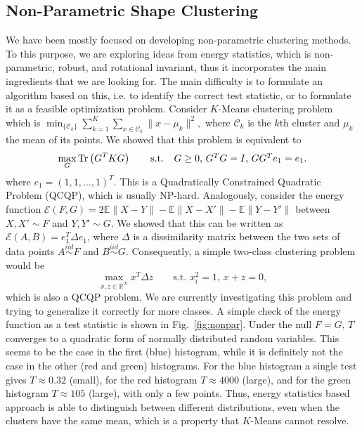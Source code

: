\documentclass[simplex.tex]{subfiles}
\begin{document}
\subsection{Non-Parametric Shape Clustering}
%
We have been mostly focused on developing 
non-parametric clustering methods.
To this purpose, we are exploring ideas from energy statistics,
which is non-parametric,
robust, and rotational invariant, thus it incorporates the main ingredients
that we are looking for. The main difficulty is to formulate an 
algorithm based on this, i.e. to identify the correct test 
statistic, or to formulate it as a feasible optimization problem.
Consider $K$-Means clustering problem which is 
$
\min_{\{\mathcal{C}_k\}} 
\sum_{k=1}^K \sum_{x \in \mathcal{C}_k} \| x - \mu_k  \|^2,
$
where $\mathcal{C}_k$ is the $k$th cluster and $\mu_k$ the mean of its points.
We showed that this problem is equivalent to
\begin{equation}
\max_{G} \textnormal{Tr}\left( G^T K G \right) \qquad 
\mbox{s.t. \, $G \ge 0$, $G^T G=I$, $G G^T e_1 = e_1$}.
\end{equation}
where $e_1 = (1,1,\dotsc,1)^T$.
This is a Quadratically Constrained Quadratic Problem (QCQP), which is usually 
NP-hard.
Analogously, consider the energy function 
$\mathcal{E}(F,G) = 2\mathbb{E} \| X - Y\| - \mathbb{E}\| X - X'\| - \mathbb{E}
\| Y - Y'\|$ between $X,X' \sim F$ and $Y,Y' \sim G$. We showed that this can
be written as $\mathcal{E}(A,B) = e_1^T \Delta e_1 $, where $\Delta$ is a
dissimilarity 
matrix between the two sets of data points 
$A \stackrel{iid}{\sim} F$ 
and $B \stackrel{iid}{\sim} G$.
Consequently, a simple two-class clustering problem would be
\begin{equation}
\max_{x,z\in \mathbb{R}^N} x^T \Delta z \qquad 
\mbox{s.t. $x_i^2=1$, $x+z = 0$},
\end{equation}
which is also a QCQP problem. We are currently investigating this problem and
trying to generalize it correctly for more classes.
A simple check of the energy function as a test statistic 
is shown in Fig.~\ref{fig:nonpar}. 
Under the null $F = G$, 
$T$ converges to a quadratic form of normally distributed random variables. This
seems to be the case in the first (blue) histogram, while it is definitely not
the case in the other (red and green) histograms. 
For the blue histogram a single test gives
$T \approx 0.32$ (small), for the red
histogram $T \approx 4000 $ (large), and for the green 
histogram $T \approx 105$ (large), with
only a few points. Thus, energy statistics based approach is 
able to distinguish between
different distributions, even when the clusters have the same mean, which is a
property that $K$-Means cannot resolve.
\end{document}
